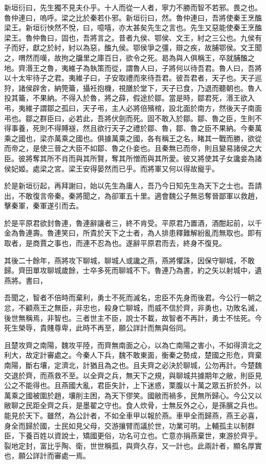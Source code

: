 新垣衍曰，先生獨不見夫仆乎。十人而從一人者，寧力不勝而智不若邪。畏之也。魯仲連曰，嗚呼。梁之比於秦若仆邪。新垣衍曰，然。魯仲連曰，吾將使秦王烹醢梁王。新垣衍怏然不悅，曰，噫嘻，亦太甚矣先生之言也。先生又惡能使秦王烹醢梁王。魯仲魯曰，固也，吾將言之。昔者九侯、鄂侯、文王，紂之三公也。九侯有子而好，獻之於紂，紂以為惡，醢九侯。鄂侯爭之彊，辯之疾，故脯鄂侯。文王聞之，喟然而嘆，故拘之牖里之庫百日，欲令之死。曷為與人俱稱王，卒就脯醢之地。齊湣王之魯，夷維子為執策而從，謂魯人曰，子將何以待吾君。魯人曰，吾將以十太牢待子之君。夷維子曰，子安取禮而來待吾君。彼吾君者，天子也。天子巡狩，諸侯辟舍，納筦籥，攝衽抱機，視膳於堂下，天子已食，乃退而聽朝也。魯人投其籥，不果納。不得入於魯，將之薛，假途於鄒。當是時，鄒君死，湣王欲入弔，夷維子謂鄒之孤曰，天子弔，主人必將倍殯棺，設北面於南方，然後天子南面弔也。鄒之群臣曰，必若此，吾將伏劍而死。固不敢入於鄒。鄒、魯之臣，生則不得事養，死則不得賻襚，然且欲行天子之禮於鄒、魯，鄒、魯之臣不果納。今秦萬乘之國也，梁亦萬乘之國也。俱據萬乘之國，各有稱王之名，睹其一戰而勝，欲從而帝之，是使三晉之大臣不如鄒、魯之仆妾也。且秦無已而帝，則且變易諸侯之大臣。彼將奪其所不肖而與其所賢，奪其所憎而與其所愛。彼又將使其子女讒妾為諸侯妃姬。處梁之宮。梁王安得晏然而已乎。而將軍又何以得故寵乎。

於是新垣衍起，再拜謝曰，始以先生為庸人，吾乃今日知先生為天下之士也。吾請出，不敢復言帝秦。秦將聞之，為卻軍五十里。適會魏公子無忌奪晉鄙軍以救趙，擊秦軍，秦軍遂引而去。

於是平原君欲封魯連，魯連辭讓者三，終不肯受。平原君乃置酒，酒酣起前，以千金為魯連壽。魯連笑曰，所貴於天下之士者，為人排患釋難解紛亂而無取也。即有取者，是商賈之事也，而連不忍為也。遂辭平原君而去，終身不復見。

其後二十餘年，燕將攻下聊城，聊城人或讒之燕，燕將懼誅，因保守聊城，不敢歸。齊田單攻聊城歲餘，士卒多死而聊城不下。魯連乃為書，約之矢以射城中，遺燕將。書曰，

吾聞之，智者不倍時而棄利，勇士不死而滅名，忠臣不先身而後君。今公行一朝之忿，不顧燕王之無臣，非忠也，殺身亡聊城，而威不信於齊，非勇也，功敗名滅，後世無稱焉，非智也。三者世主不臣，說士不載，故智者不再計，勇士不怯死。今死生榮辱，貴賤尊卑，此時不再至，願公詳計而無與俗同。

且楚攻齊之南陽，魏攻平陸，而齊無南面之心，以為亡南陽之害小，不如得濟北之利大，故定計審處之。今秦人下兵，魏不敢東面，衡秦之勢成，楚國之形危，齊棄南陽，斷右壤，定濟北，計猶且為之也。且夫齊之必決於聊城，公勿再計。今楚魏交退於齊，而燕救不至。以全齊之兵，無天下之規，與聊城共據期年之敝，則臣見公之不能得也。且燕國大亂，君臣失計，上下迷惑，栗腹以十萬之眾五折於外，以萬乘之國被圍於趙，壤削主困，為天下僇笑。國敝而禍多，民無所歸心。今公又以敝聊之民距全齊之兵，是墨翟之守也。食人炊骨，士無反外之心，是孫臏之兵也。能見於天下。雖然，為公計者，不如全車甲以報於燕。車甲全而歸燕，燕王必喜，身全而歸於國，士民如見父母，交游攘臂而議於世，功業可明。上輔孤主以制群臣，下養百姓以資說士，矯國更俗，功名可立也。亡意亦捐燕棄世，東游於齊乎。裂地定封，富比乎陶、衛，世世稱孤，與齊久存，又一計也。此兩計者，顯名厚實也，願公詳計而審處一焉。

